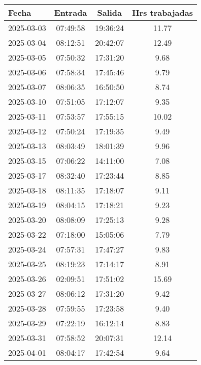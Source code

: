 \documentclass[11pt,a4paper]{article}
\newcommand{\mejoradatabla}[1]{
  \renewcommand{\arraystretch}{1.3}
  \setlength{\tabcolsep}{10pt}
  #1
  \renewcommand{\arraystretch}{1}
  \setlength{\tabcolsep}{6pt}
}
\begin{document}
\begin{minipage}[t]{0.62\textwidth}
\mejoradatabla{
\begin{tabular}{lccc}
\toprule
\rowcolor{grisclaro} \textbf{Fecha} & \textbf{Entrada} & \textbf{Salida} & \textbf{Hrs trabajadas}\\
\midrule

2025-03-03 & 07:49:58 & 19:36:24 & 11.77\\

2025-03-04 & 08:12:51 & 20:42:07 & 12.49\\

2025-03-05 & 07:50:32 & 17:31:20 & 9.68\\

2025-03-06 & 07:58:34 & 17:45:46 & 9.79\\

2025-03-07 & 08:06:35 & 16:50:50 & 8.74\\

2025-03-10 & 07:51:05 & 17:12:07 & 9.35\\

2025-03-11 & 07:53:57 & 17:55:15 & 10.02\\

2025-03-12 & 07:50:24 & 17:19:35 & 9.49\\

2025-03-13 & 08:03:49 & 18:01:39 & 9.96\\

2025-03-15 & 07:06:22 & 14:11:00 & 7.08\\

2025-03-17 & 08:32:40 & 17:23:44 & 8.85\\

2025-03-18 & 08:11:35 & 17:18:07 & 9.11\\

2025-03-19 & 08:04:15 & 17:18:21 & 9.23\\

2025-03-20 & 08:08:09 & 17:25:13 & 9.28\\

2025-03-22 & 07:18:00 & 15:05:06 & 7.79\\

2025-03-24 & 07:57:31 & 17:47:27 & 9.83\\

2025-03-25 & 08:19:23 & 17:14:17 & 8.91\\

2025-03-26 & 02:09:51 & 17:51:02 & 15.69\\

2025-03-27 & 08:06:12 & 17:31:20 & 9.42\\

2025-03-28 & 07:59:55 & 17:23:58 & 9.40\\

2025-03-29 & 07:22:19 & 16:12:14 & 8.83\\

2025-03-31 & 07:58:52 & 20:07:31 & 12.14\\

2025-04-01 & 08:04:17 & 17:42:54 & 9.64\\

\bottomrule
\end{tabular}
}
\end{minipage}
\end{document}
